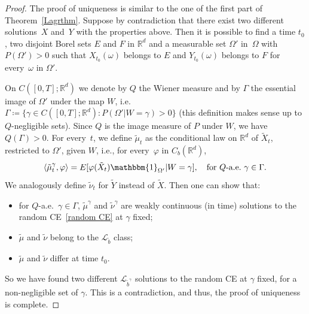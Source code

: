 \documentclass[a4paper,10pt]{article}
\newcommand\1{\mathbbm{1}}
\newcommand{\mr}{\mathbb{R}}
\newcommand{\mc}{\mathcal}
\newcommand{\lan}{\langle}
\newcommand{\ran}{\rangle}
\newcommand{\td}{\tilde}
\numberwithin{equation}{section}
\begin{document}
\begin{proof}
The proof of uniqueness is similar to the one of the first part of Theorem~\ref{Lagrthm}. Suppose by contradiction that there exist two different solutions~$X$ and~$Y$ with the properties above. Then it is possible to find a time $t_0$, two disjoint Borel sets $E$ and $F$ in $\mr^d$ and a measurable set $\Omega'$ in~$\Omega$ with $P(\Omega')>0$ such that $X_{t_0}(\omega)$ belongs to $E$ and $Y_{t_0}(\omega)$ belongs to $F$ for every~$\omega$ in $\Omega'$.

On $C([0,T];\mr^d)$ we denote by $Q$ the Wiener measure and by $\Gamma$ the essential image of $\Omega'$ under the map $W$, i.e.\ $\Gamma \coloneqq \{\gamma \in C([0,T];\mr^d) \colon P(\Omega' | W=\gamma)>0\}$ (this definition makes sense up to $Q$-negligible sets). Since $Q$ is the image measure of $P$ under $W$, we have $Q(\Gamma)>0$. For every~$t$, we define $\td{\mu}_t$ as the conditional law on $\mr^d$ of $\td{X}_t$, restricted to $\Omega'$, given $W$, i.e., for every~$\varphi$ in $C_b(\mr^d)$,
\begin{equation*}
\lan\td{\mu}_t^{\gamma},\varphi\ran= E[\varphi(\td{X}_t) \1_{\Omega'} | W=\gamma] ,\quad \mbox{for $Q$-a.e.~}\gamma\in\Gamma.
\end{equation*}
We analogously define $\td{\nu}_t$ for $\td{Y}$ instead of $\td{X}$. Then one can show that:
\begin{itemize}
\item for $Q$-a.e.~$\gamma \in \Gamma$, $\td{\mu}^{\gamma}$ and $\td{\nu}^{\gamma}$ are weakly continuous (in time) solutions to the random CE~\eqref{random CE} at $\gamma$ fixed;
\item $\td{\mu}$ and $\td{\nu}$ belong to the $\mc{L}_{\td{b}}$ class;
\item $\td{\mu}$ and $\td{\nu}$ differ at time $t_0$.
\end{itemize}
So we have found two different $\mc{L}_{\td{b}^{\gamma}}$ solutions to the random CE at $\gamma$ fixed, for a non-negligible set of $\gamma$. This is a contradiction, and thus, the proof of uniqueness is complete.


\end{proof}
\end{document}
